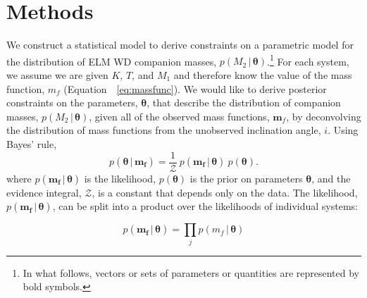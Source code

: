 \documentclass[apjl]{emulateapj}
\newcommand{\given}{\,|\,}
\newcommand{\bs}[1]{\boldsymbol{#1}}
\newcommand{\eqn}{Equation~}
\newcommand{\mf}{m_f}
\begin{document}
\section{Methods}

We construct a statistical model to derive constraints on a parametric model for the distribution of ELM WD companion masses, $p(M_2 \given \bs{\theta})$.\footnote{In what follows, vectors or sets of parameters or quantities are represented by bold symbols.} For each system, we assume we are given $K$, $T$, and $M_1$ and therefore know the value of the mass function, $\mf$ (\eqn~\ref{eq:massfunc}). We would like to derive posterior constraints on the parameters, $\bs{\theta}$, that describe the distribution of companion masses, $p(M_2\given \bs{\theta})$, given all of the observed mass functions, $\bs{m}_f$, by deconvolving the distribution of mass functions from the unobserved inclination angle, $i$. Using Bayes' rule,
\begin{equation}
    p(\bs{\theta} \given \bs{\mf}) = \frac{1}{\mathcal{Z}}~p(\bs{\mf} \given \bs{\theta})~p(\bs{\theta}).
\end{equation}
where $p(\bs{\mf} \given \bs{\theta})$ is the likelihood, $p(\bs{\theta})$ is the prior on parameters $\bs{\theta}$, and the evidence integral, $\mathcal{Z}$, is a constant that depends only on the data. The likelihood, $p(\bs{\mf} \given \bs{\theta})$, can be split into a product over the likelihoods of individual systems:

\begin{equation}
p(\bs{\mf} \given \bs{\theta}) = \prod_j p(\mf \given \bs{\theta})
\end{equation}
\end{document}
